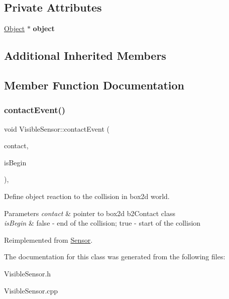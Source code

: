 \subsection*{Private Attributes}
\begin{DoxyCompactItemize}
\item 
\mbox{\label{class_visible_sensor_a933e07d2186c63f9333778a213dd0cd5}} 
\hyperlink{class_object}{Object} $\ast$ {\bfseries object}
\end{DoxyCompactItemize}
\subsection*{Additional Inherited Members}


\subsection{Member Function Documentation}
\mbox{\label{class_visible_sensor_a63bcb9da7556a6356cca3b08f7808bd8}} 
\subsubsection{\texorpdfstring{contact\+Event()}{contactEvent()}}
{\footnotesize\ttfamily void Visible\+Sensor\+::contact\+Event (\begin{DoxyParamCaption}\item[{b2\+Contact $\ast$}]{contact,  }\item[{bool}]{is\+Begin }\end{DoxyParamCaption})\hspace{0.3cm}{\ttfamily [private]}, {\ttfamily [virtual]}}



Define object reaction to the collision in box2d world. 


\begin{DoxyParams}{Parameters}
{\em contact} & pointer to box2d b2\+Contact class \\
\hline
{\em is\+Begin} & \textquotesingle{}false\textquotesingle{} -\/ end of the collision; \textquotesingle{}true\textquotesingle{} -\/ start of the collision \\
\hline
\end{DoxyParams}


Reimplemented from \hyperlink{class_sensor_a08bfa36c84277677f3bd5fb14127fca7}{Sensor}.



The documentation for this class was generated from the following files\+:\begin{DoxyCompactItemize}
\item 
Visible\+Sensor.\+h\item 
Visible\+Sensor.\+cpp\end{DoxyCompactItemize}
